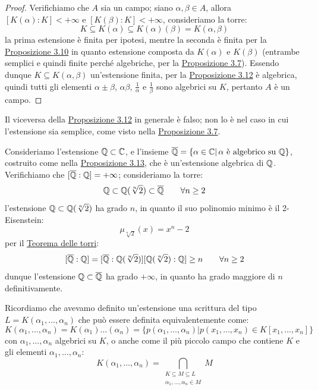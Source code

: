 \documentclass[11pt]{scrartcl}
\begin{document}
\begin{proof}
    Verifichiamo che $A$ sia un campo; siano $\alpha,\beta \in A$, allora $[K(\alpha):K] <+\infty$ e $[K(\beta):K]<+\infty$, consideriamo la torre:
    \[ K \subseteq K(\alpha) \subseteq K(\alpha)(\beta) = K(\alpha,\beta)
        \]
    la prima estensione è finita per ipotesi, mentre la seconda è finita per la \hyperref[3.10]{Proposizione 3.10} in quanto estensione composta da $K(\alpha)$ e $K(\beta)$ (entrambe semplici e quindi finite perché algebriche, per la \hyperref[3.7]{Proposizione 3.7}).
    Essendo dunque $K \subseteq K(\alpha,\beta)$ un'estensione finita, per la \hyperref[3.12]{Proposizione 3.12}
    è algebrica, quindi tutti gli elementi $\alpha\pm\beta$, $\alpha\beta$, $\displaystyle\frac{1}{\alpha}$ e $\displaystyle\frac{1}{\beta}$ sono algebrici su $K$, pertanto $A$ è un campo.
\end{proof}

\begin{remark}
    Il viceversa della \hyperref[3.12]{Proposizione 3.12} in generale è falso; non lo è nel caso in cui l'estensione sia semplice, come visto nella \hyperref[3.7]{Proposizione 3.7}.
\end{remark}

\begin{example}
    Consideriamo l'estensione $\mathbb Q \subset \mathbb C$, e l'insieme $\overline{\mathbb Q} = \{\alpha \in \mathbb C | \, \text{$\alpha$ è algebrico su $\mathbb Q$}\}$, costruito come nella \hyperref[3.13]{Proposizione 3.13},
    che è un'estensione algebrica di $\mathbb Q$. Verifichiamo che $[\overline{\mathbb Q}:\mathbb Q] = +\infty$; consideriamo la torre:
    \[ \mathbb Q \subset \mathbb Q(\sqrt[n]{2}) \subset \overline {\mathbb Q} \qquad \forall n \geq 2
        \]
    l'estensione $\mathbb Q \subset \mathbb Q(\sqrt[n]{2})$ ha grado $n$, in quanto il suo polinomio minimo è il 2-Eisenstein:
    \[ \mu_{\sqrt[n]{2}}(x) = x^n - 2
        \]
    per il \hyperref[torri]{Teorema delle torri}:
    \[ [\overline {\mathbb Q}: \mathbb Q] = [\overline {\mathbb Q}: \mathbb Q(\sqrt[n]{2})] [\mathbb Q(\sqrt[n]{2}) : \mathbb Q] \geq n \qquad \forall n \geq 2
        \]
    dunque l'estensione $\mathbb Q \subset \overline{\mathbb Q}$ ha grado $+\infty$, in quanto ha grado maggiore di $n$ definitivamente.
\end{example}

\pagebreak

\begin{remark}
    Ricordiamo che avevamo definito un'estensione  una scrittura del tipo $L = K(\alpha_1,\ldots,\alpha_n)$ che può essere definita equivalentemente come:
    \[ K(\alpha_1,\ldots,\alpha_n) = K(\alpha_1)\ldots(\alpha_n) = \{p(\alpha_1,\ldots,\alpha_n) | p(x_1,\ldots,x_n) \in K[x_1,\ldots,x_n] \}
        \]
    con $\alpha_1,\ldots,\alpha_n$ algebrici su $K$, o anche come il più piccolo campo che contiene $K$ e gli elementi $\alpha_1,\ldots,\alpha_n$:
    \[ K(\alpha_1,\ldots,\alpha_n) = \bigcap_{\substack{K \subseteq M \subseteq L \\ \alpha_1,\ldots,\alpha_n \in M}}M
        \]
\end{remark}
\end{document}
